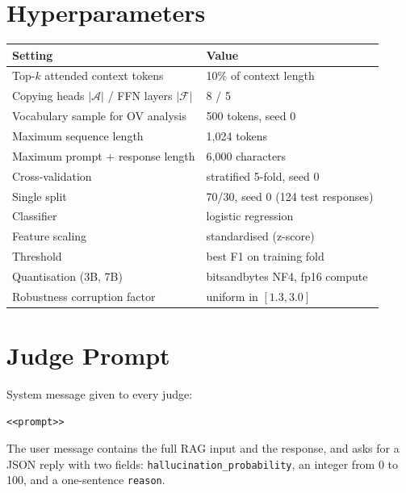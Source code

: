 \documentclass[conference]{IEEEtran}
\begin{document}
\appendices
\section{Hyperparameters}
\label{app:hyper}
\begin{table}[h]
\centering\footnotesize
\begin{tabular}{@{}ll@{}}
\toprule
Setting & Value \\
\midrule
Top-$k$ attended context tokens & 10\% of context length \\
Copying heads $|\mathcal{A}|$ / FFN layers $|\mathcal{F}|$ & 8 / 5 \\
Vocabulary sample for OV analysis & 500 tokens, seed 0 \\
Maximum sequence length & 1{,}024 tokens \\
Maximum prompt + response length & 6{,}000 characters \\
Cross-validation & stratified 5-fold, seed 0 \\
Single split & 70/30, seed 0 (124 test responses) \\
Classifier & logistic regression \\
Feature scaling & standardised (z-score) \\
Threshold & best F1 on training fold \\
Quantisation (3B, 7B) & bitsandbytes NF4, fp16 compute \\
Robustness corruption factor & uniform in $[1.3, 3.0]$ \\
\bottomrule
\end{tabular}
\end{table}

\section{Judge Prompt}
\label{app:prompt}
System message given to every judge:
\begin{footnotesize}
\begin{verbatim}
<<prompt>>
\end{verbatim}
\end{footnotesize}
The user message contains the full RAG input and the response, and asks for a JSON reply with two fields: \texttt{hallucination\_probability}, an integer from 0 to 100, and a one-sentence \texttt{reason}.
\end{document}

